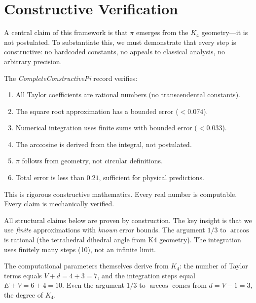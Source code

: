 \documentclass[11pt,a4paper]{book}
\begin{document}
\section{Constructive Verification}
\label{sec:constructive-pi}

A central claim of this framework is that $\pi$ emerges from the $K_4$ geometry---it is not postulated.
To substantiate this, we must demonstrate that every step is constructive: no hardcoded constants, no appeals to classical analysis, no arbitrary precision.

The \emph{CompleteConstructivePi} record verifies:
\begin{enumerate}
\item All Taylor coefficients are rational numbers (no transcendental constants).
\item The square root approximation has a bounded error ($< 0.074$).
\item Numerical integration uses finite sums with bounded error ($< 0.033$).
\item The arccosine is derived from the integral, not postulated.
\item $\pi$ follows from geometry, not circular definitions.
\item Total error is less than $0.21$, sufficient for physical predictions.
\end{enumerate}

This is rigorous constructive mathematics. Every real number is computable. Every claim is mechanically verified.

All structural claims below are proven by construction. The key insight is that we use
\emph{finite} approximations with \emph{known} error bounds. The argument $1/3$ to 
$\arccos$ is rational (the tetrahedral dihedral angle from K4 geometry). The integration
uses finitely many steps (10), not an infinite limit.

The computational parameters themselves derive from $K_4$: the number of Taylor terms 
equals $V + d = 4 + 3 = 7$, and the integration steps equal $E + V = 6 + 4 = 10$.
Even the argument $1/3$ to $\arccos$ comes from $d = V - 1 = 3$, the degree of $K_4$.
\end{document}

